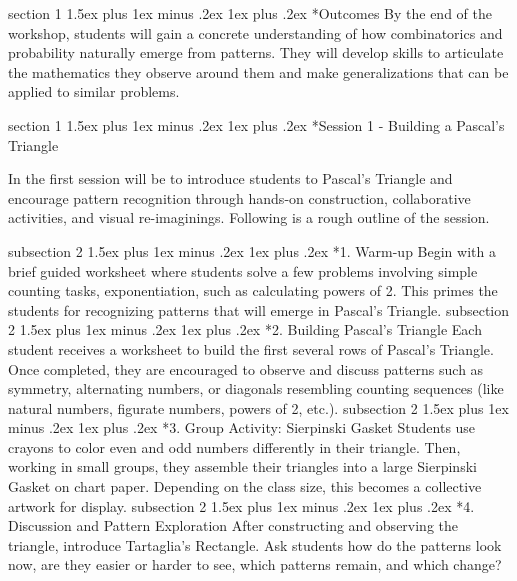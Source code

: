 \documentclass[a4paper,twoside,notitlepage,
11pt,
]{amsart}
\makeatletter
\renewcommand{\section}{\@startsection
  {section}%
  {1}%
  {\z@}%
  {1.5ex plus 1ex minus .2ex}%
  {1ex plus .2ex}%
  {\normalfont\bfseries}}%
\renewcommand{\subsection}{\@startsection
    {subsection}%
    {2}%
    {\z@}%
    {1.5ex plus 1ex minus .2ex}%
    {1ex plus .2ex}%
    {\normalfont\itshape}}%
\makeatother
\begin{document}
\section*{Outcomes}
By the end of the workshop, students will gain a concrete understanding of how combinatorics and probability naturally emerge from patterns. They will develop skills to articulate the mathematics they observe around them and make generalizations that can be applied to similar problems.

\section*{Session 1 - Building a Pascal's Triangle}

In the first session will be to introduce students to Pascal's Triangle and encourage pattern recognition through hands-on construction, collaborative activities, and visual re-imaginings. Following is a rough outline of the session.

\subsection*{1. Warm-up}
Begin with a brief guided worksheet where students solve a few problems involving simple counting tasks, exponentiation, such as calculating powers of 2. This primes the students for recognizing patterns that will emerge in Pascal's Triangle.
\subsection*{2. Building Pascal's Triangle}
Each student receives a worksheet to build the first several rows of Pascal’s Triangle. Once completed, they are encouraged to observe and discuss patterns such as symmetry, alternating numbers, or diagonals resembling counting sequences (like natural numbers, figurate numbers, powers of 2, etc.).
\subsection*{3. Group Activity: Sierpinski Gasket}
Students use crayons to color even and odd numbers differently in their triangle. Then, working in small groups, they assemble their triangles into a large Sierpinski Gasket on chart paper. Depending on the class size, this becomes a collective artwork for display.
\subsection*{4. Discussion and Pattern Exploration}
After constructing and observing the triangle, introduce Tartaglia's Rectangle. Ask students how do the patterns look now, are they easier or harder to see, which patterns remain, and which change?
\end{document}
